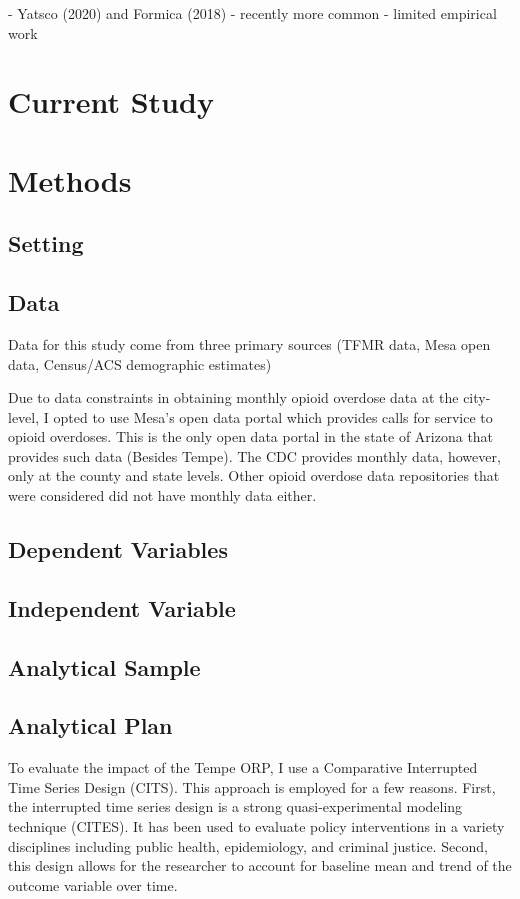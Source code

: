 - Yatsco (2020) and Formica (2018)
- recently more common
- limited empirical work

\section{\centering Current Study}
\section{\centering Methods}
\subsection{Setting}

\subsection{Data}
Data for this study come from three primary sources (TFMR data, Mesa open data, Census/ACS demographic estimates)

Due to data constraints in obtaining monthly opioid overdose data at the city-level, I opted to use Mesa's open data portal which provides calls for service to opioid overdoses. This is the only open data portal in the state of Arizona that provides such data (Besides Tempe). The CDC provides monthly data, however, only at the county and state levels. Other opioid overdose data repositories that were considered did not have monthly data either.

\subsection{Dependent Variables}
\subsection{Independent Variable}
\subsection{Analytical Sample}
\subsection{Analytical Plan}

To evaluate the impact of the Tempe ORP, I use a Comparative Interrupted Time Series Design (CITS). This approach is employed for a few reasons. First, the interrupted time series design is a strong quasi-experimental modeling technique (CITES). It has been used to evaluate policy interventions in a variety disciplines including public health, epidemiology, and criminal justice. Second, this design allows for the researcher to account for baseline mean and trend of the outcome variable over time.

